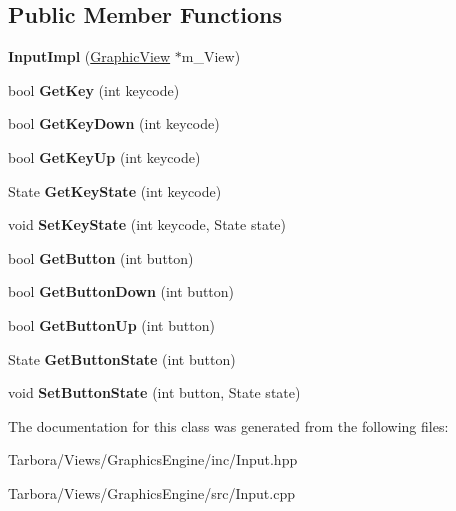 \subsection*{Public Member Functions}
\begin{DoxyCompactItemize}
\item 
\mbox{\label{classTarbora_1_1InputImpl_a3ef182f188698788b852508e0291064f}} 
{\bfseries Input\+Impl} (\hyperlink{classTarbora_1_1GraphicView}{Graphic\+View} $\ast$m\+\_\+\+View)
\item 
\mbox{\label{classTarbora_1_1InputImpl_a7650cf22515327044b0cbfaf23d5fc4d}} 
bool {\bfseries Get\+Key} (int keycode)
\item 
\mbox{\label{classTarbora_1_1InputImpl_a52623532e2dc4eab4c5a59e738cd0ffa}} 
bool {\bfseries Get\+Key\+Down} (int keycode)
\item 
\mbox{\label{classTarbora_1_1InputImpl_a62a7669f5c9a14c787c4d47a09307d46}} 
bool {\bfseries Get\+Key\+Up} (int keycode)
\item 
\mbox{\label{classTarbora_1_1InputImpl_a336c795263565d25e9da65123265253e}} 
State {\bfseries Get\+Key\+State} (int keycode)
\item 
\mbox{\label{classTarbora_1_1InputImpl_a0cbb9e918521d66c7d6d93d41090c9c7}} 
void {\bfseries Set\+Key\+State} (int keycode, State state)
\item 
\mbox{\label{classTarbora_1_1InputImpl_a04c8c1a5ec8dd12a7db887900789101f}} 
bool {\bfseries Get\+Button} (int button)
\item 
\mbox{\label{classTarbora_1_1InputImpl_aaf2d6f0b5efcecb6b5520eedd8f914d5}} 
bool {\bfseries Get\+Button\+Down} (int button)
\item 
\mbox{\label{classTarbora_1_1InputImpl_a8330b9fee532e430c6ae9d96fc4402ab}} 
bool {\bfseries Get\+Button\+Up} (int button)
\item 
\mbox{\label{classTarbora_1_1InputImpl_ae65d0f8cd036805cadc6a0a089ae84c2}} 
State {\bfseries Get\+Button\+State} (int button)
\item 
\mbox{\label{classTarbora_1_1InputImpl_a79f7af9572f945ca8f6868ec58e6fff5}} 
void {\bfseries Set\+Button\+State} (int button, State state)
\end{DoxyCompactItemize}


The documentation for this class was generated from the following files\+:\begin{DoxyCompactItemize}
\item 
Tarbora/\+Views/\+Graphics\+Engine/inc/Input.\+hpp\item 
Tarbora/\+Views/\+Graphics\+Engine/src/Input.\+cpp\end{DoxyCompactItemize}

